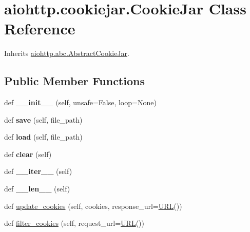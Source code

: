 \hypertarget{classaiohttp_1_1cookiejar_1_1_cookie_jar}{}\section{aiohttp.\+cookiejar.\+Cookie\+Jar Class Reference}
\label{classaiohttp_1_1cookiejar_1_1_cookie_jar}


Inherits \hyperlink{classaiohttp_1_1abc_1_1_abstract_cookie_jar}{aiohttp.\+abc.\+Abstract\+Cookie\+Jar}.

\subsection*{Public Member Functions}
\begin{DoxyCompactItemize}
\item 
\mbox{\label{classaiohttp_1_1cookiejar_1_1_cookie_jar_a0fa2d3885d8b78fe65afe1dde7d7dcdc}} 
def {\bfseries \+\_\+\+\_\+init\+\_\+\+\_\+} (self, unsafe=False, loop=None)
\item 
\mbox{\label{classaiohttp_1_1cookiejar_1_1_cookie_jar_a548ce87c7fc38557735ad0fd4695bfd2}} 
def {\bfseries save} (self, file\+\_\+path)
\item 
\mbox{\label{classaiohttp_1_1cookiejar_1_1_cookie_jar_a8ef03b56e3cca9022ad9d6f9fd42832c}} 
def {\bfseries load} (self, file\+\_\+path)
\item 
\mbox{\label{classaiohttp_1_1cookiejar_1_1_cookie_jar_aecdc7cb944b1607040c722db026d9962}} 
def {\bfseries clear} (self)
\item 
\mbox{\label{classaiohttp_1_1cookiejar_1_1_cookie_jar_ab660eabee24ea7d2ca69ea2445a8b178}} 
def {\bfseries \+\_\+\+\_\+iter\+\_\+\+\_\+} (self)
\item 
\mbox{\label{classaiohttp_1_1cookiejar_1_1_cookie_jar_a832e467c5256e3bd018bb60946ea2749}} 
def {\bfseries \+\_\+\+\_\+len\+\_\+\+\_\+} (self)
\item 
def \hyperlink{classaiohttp_1_1cookiejar_1_1_cookie_jar_a98a3d64c7985022211dc300a2a46df73}{update\+\_\+cookies} (self, cookies, response\+\_\+url=\hyperlink{classyarl_1_1_u_r_l}{U\+RL}())
\item 
def \hyperlink{classaiohttp_1_1cookiejar_1_1_cookie_jar_a3e75b49672d8145ac740c8892bb3b077}{filter\+\_\+cookies} (self, request\+\_\+url=\hyperlink{classyarl_1_1_u_r_l}{U\+RL}())
\end{DoxyCompactItemize}
